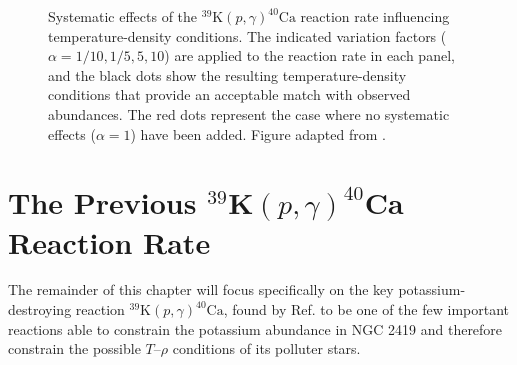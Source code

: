 \begin{figure}[t]
\centering
\noindent
{}
\caption{\label{fig:39K_p_g_Sens}Systematic effects of the $^{39}\mathrm{K}(p,\gamma)^{40}\mathrm{Ca}$ reaction rate influencing temperature-density conditions. The indicated variation factors ($\alpha = 1/10, 1/5, 5, 10$) are applied to the reaction rate in each panel, and the black dots show the resulting temperature-density conditions that provide an acceptable match with observed abundances. The red dots represent the case where no systematic effects ($\alpha=1$) have been added. Figure adapted from \cite{Dermigny2017}.}
\end{figure}

\section{The Previous $^{39}\mathrm{\textbf{K}}(p,\gamma)^{40}\mathrm{\textbf{Ca}}$ Reaction Rate} \label{sec:prev_39K_p_g_rate}

The remainder of this chapter will focus specifically on the key potassium-destroying reaction $^{39}\mathrm{K}(p,\gamma)^{40}\mathrm{Ca}$, found by Ref. \cite{Dermigny2017} to be one of the few important reactions able to constrain the potassium abundance in NGC 2419 and therefore constrain the possible $T$--$\rho$ conditions of its polluter stars. 

